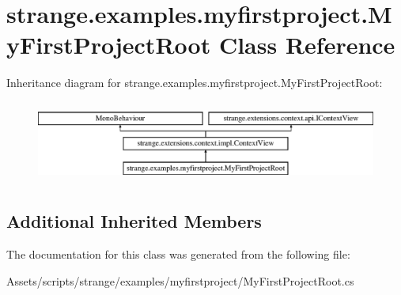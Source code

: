 \hypertarget{classstrange_1_1examples_1_1myfirstproject_1_1_my_first_project_root}{\section{strange.\-examples.\-myfirstproject.\-My\-First\-Project\-Root Class Reference}
\label{classstrange_1_1examples_1_1myfirstproject_1_1_my_first_project_root}
}
Inheritance diagram for strange.\-examples.\-myfirstproject.\-My\-First\-Project\-Root\-:\begin{figure}[H]
\begin{center}
\leavevmode
\includegraphics[height=2.709677cm]{classstrange_1_1examples_1_1myfirstproject_1_1_my_first_project_root}
\end{center}
\end{figure}
\subsection*{Additional Inherited Members}


The documentation for this class was generated from the following file\-:\begin{DoxyCompactItemize}
\item 
Assets/scripts/strange/examples/myfirstproject/My\-First\-Project\-Root.\-cs\end{DoxyCompactItemize}
